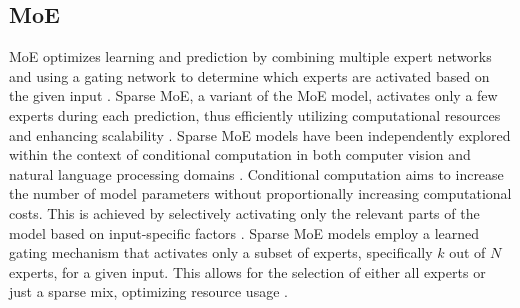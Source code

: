 \documentclass[11pt]{article}
\begin{document}
\subsection{MoE}
MoE optimizes learning and prediction by combining multiple expert networks and using a gating network to determine which experts are activated based on the given input \cite{zhang2024scalable,fedus2022switch}. Sparse MoE, a variant of the MoE model, activates only a few experts during each prediction, thus efficiently utilizing computational resources and enhancing scalability \cite{shazeer2016outrageously}.
Sparse MoE models have been independently explored within the context of conditional computation in both computer vision and natural language processing domains \citet{jacobs1991adaptive,fedus2022review}. Conditional computation aims to increase the number of model parameters without proportionally increasing computational costs. This is achieved by selectively activating only the relevant parts of the model based on input-specific factors \cite{shazeer2016outrageously}. Sparse MoE models employ a learned gating mechanism that activates only a subset of experts, specifically \( k \) out of \( N \) experts, for a given input. This allows for the selection of either all experts or just a sparse mix, optimizing resource usage \citet{lepikhin2020gshard}. 


\end{document}

